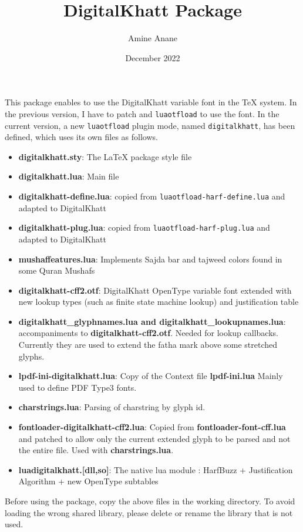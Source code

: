 \documentclass{article}
\title{DigitalKhatt \LuaLaTeX{} Package}
\date{December 2022}
\author{Amine Anane}
\newcommand{\DigitalKhatt}{DigitalKhatt}
\newcommand{\LuaOTFLoad}{\mbox{\texttt{luaotfload}}}
\begin{document}
\maketitle
This \LuaLaTeX{} package enables to use the \DigitalKhatt{} variable font in the \TeX{} system. In the previous version, I have to patch \LuaTeX{} and \LuaOTFLoad{} to use the font.
In the current version, a new \LuaOTFLoad{} plugin mode, named \mbox{\texttt{digitalkhatt}}, has been defined, which uses its own files as follows.
\begin{itemize}
  \item {\bf digitalkhatt.sty}: The \LaTeX{} package style file
  \item {\bf digitalkhatt.lua}: Main file
  \item {\bf digitalkhatt-define.lua}: copied from \mbox{\texttt{luaotfload-harf-define.lua}} and adapted to \DigitalKhatt{}
  \item {\bf digitalkhatt-plug.lua}: copied from \mbox{\texttt{luaotfload-harf-plug.lua}} and adapted to \DigitalKhatt{}
  \item {\bf mushaffeatures.lua}: Implements Sajda bar  and tajweed colors found in some Quran Mushafs
  \item {\bf digitalkhatt-cff2.otf}: DigitalKhatt OpenType variable font extended with new lookup types (such as finite state machine lookup) and justification table
  \item {\bf digitalkhatt\_glyphnames.lua and digitalkhatt\_lookupnames.lua}: accompaniments to {\bf digitalkhatt-cff2.otf}. Needed for lookup callbacks.
    Currently they are used to extend the fatha mark above some stretched glyphs.
  \item {\bf lpdf-ini-digitalkhatt.lua}: Copy of the Context file {\bf lpdf-ini.lua} Mainly  used to define PDF Type3 fonts.
  \item {\bf charstrings.lua}: Parsing of charstring by glyph id.
  \item {\bf fontloader-digitalkhatt-cff2.lua}: Copied from {\bf fontloader-font-cff.lua} and patched to allow only the current extended glyph to be parsed and not the entire file. Used with {\bf charstrings.lua}.
  \item {\bf luadigitalkhatt.[dll,so]}: The native lua module : HarfBuzz + Justification Algorithm + new OpenType subtables 
\end{itemize}
Before using the package, copy the above files in the working directory. To avoid loading the wrong shared library, please delete or rename the library that is not used.
\end{document}

